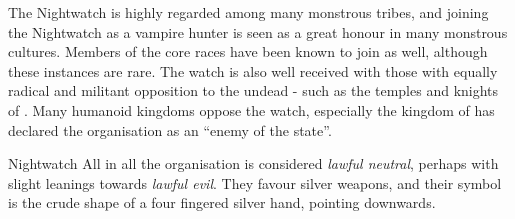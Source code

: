 The Nightwatch is highly regarded among many monstrous tribes, and joining the
Nightwatch as a vampire hunter is seen as a great honour in many monstrous
cultures. Members of the core races have been known to join as well, although
these instances are rare. The watch is also well received with those with
equally radical and militant opposition to the undead - such as the temples
and knights of . Many humanoid kingdoms oppose the watch,
especially the kingdom of  has declared the
organisation as an ``enemy of the state''.

\begin{35e}{Nightwatch}
  All in all the organisation is considered \emph{lawful neutral}, perhaps
  with slight leanings towards \emph{lawful evil}. They favour silver weapons,
  and their symbol is the crude shape of a four fingered silver hand, pointing
  downwards.
\end{35e}
